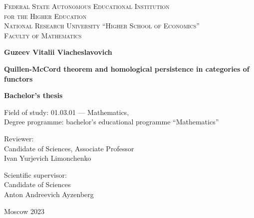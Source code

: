 \documentclass[english,12pt]{article}
\numberwithin{equation}{section}
\theoremstyle{definition}
\theoremstyle{remark}
\begin{document}
\begin{center}
{\scshape Federal State Autonomous Educational Institution\\
for the Higher Education\\
National Research University ``Higher School of Economics''\\[1ex]
Faculty of Mathematics\par}

\par\vfill

\textbf{\large Guzeev Vitalii Viacheslavovich}

\vspace{1.5cm}

{\Large\bfseries
Quillen-McCord theorem and homological persistence in categories of functors
\par}

\vspace{1.5cm}

\textbf{\large Bachelor's thesis}

\vspace{1cm}

Field of study: 01.03.01 --- Mathematics,\\[1ex]
Degree programme: bachelor's educational programme ``Mathematics''
\par\vfill
\noindent\parbox[t]{0.48\textwidth}{%
Reviewer:\\[3pt]
Candidate of Sciences, Associate Professor\\
Ivan Yurjevich Limonchenko  
}\hspace{0.04\textwidth}\parbox[t]{0.48\textwidth}{%
Scientific supervisor:\\[3pt]
Candidate of Sciences\\
Anton Andreevich Ayzenberg\\[2ex]
}%
\par\vfill\vfill
Moscow 2023
\end{center}
\thispagestyle{empty}
\pagebreak
{}
\end{document}
